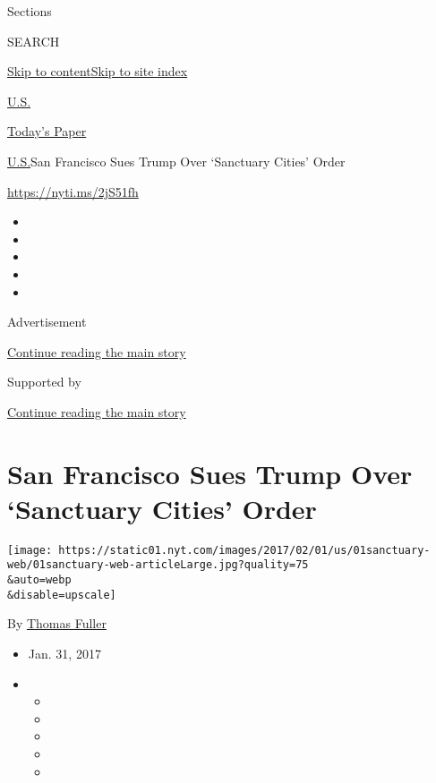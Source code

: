 Sections

SEARCH

\protect\hyperlink{site-content}{Skip to
content}\protect\hyperlink{site-index}{Skip to site index}

\href{https://www.nytimes.com/section/us}{U.S.}

\href{https://myaccount.nytimes.com/auth/login?response_type=cookie\&client_id=vi}{}

\href{https://www.nytimes.com/section/todayspaper}{Today's Paper}

\href{/section/us}{U.S.}\textbar{}San Francisco Sues Trump Over
`Sanctuary Cities' Order

\url{https://nyti.ms/2jS51fh}

\begin{itemize}
\item
\item
\item
\item
\item
\end{itemize}

Advertisement

\protect\hyperlink{after-top}{Continue reading the main story}

Supported by

\protect\hyperlink{after-sponsor}{Continue reading the main story}

\hypertarget{san-francisco-sues-trump-over-sanctuary-cities-order}{%
\section{San Francisco Sues Trump Over `Sanctuary Cities'
Order}\label{san-francisco-sues-trump-over-sanctuary-cities-order}}

\texttt{[image: https://static01.nyt.com/images/2017/02/01/us/01sanctuary-web/01sanctuary-web-articleLarge.jpg?quality=75\\\&auto=webp\\\&disable=upscale]}

By \href{https://www.nytimes.com/by/thomas-fuller}{Thomas Fuller}

\begin{itemize}
\item
  Jan. 31, 2017
\item
  \begin{itemize}
  \item
  \item
  \item
  \item
  \item
  \end{itemize}
\end{itemize}

